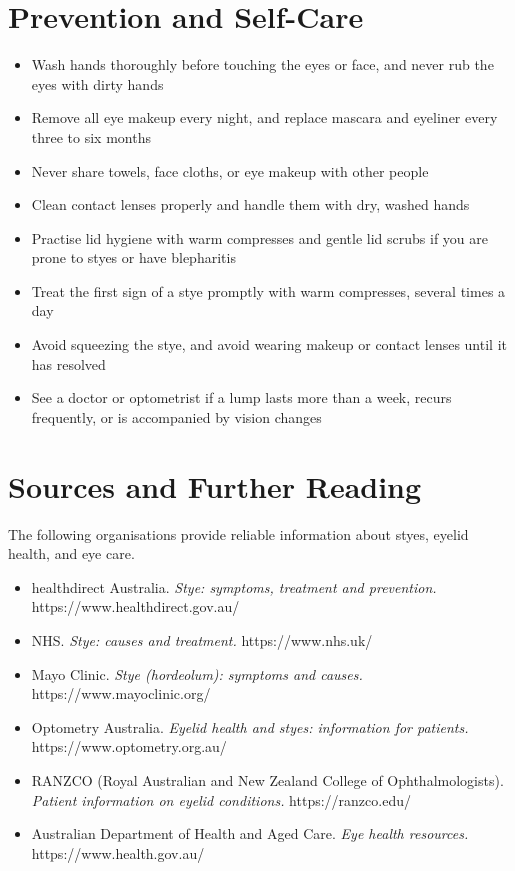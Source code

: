 \section*{Prevention and Self-Care}
\begin{itemize}
    \item Wash hands thoroughly before touching the eyes or face, and never rub the eyes with dirty hands
    \item Remove all eye makeup every night, and replace mascara and eyeliner every three to six months
    \item Never share towels, face cloths, or eye makeup with other people
    \item Clean contact lenses properly and handle them with dry, washed hands
    \item Practise lid hygiene with warm compresses and gentle lid scrubs if you are prone to styes or have blepharitis
    \item Treat the first sign of a stye promptly with warm compresses, several times a day
    \item Avoid squeezing the stye, and avoid wearing makeup or contact lenses until it has resolved
    \item See a doctor or optometrist if a lump lasts more than a week, recurs frequently, or is accompanied by vision changes
\end{itemize}

\section*{Sources and Further Reading}
The following organisations provide reliable information about styes, eyelid health, and eye care.

\begin{itemize}
    \item healthdirect Australia. \textit{Stye: symptoms, treatment and prevention.} https://www.healthdirect.gov.au/
    \item NHS. \textit{Stye: causes and treatment.} https://www.nhs.uk/
    \item Mayo Clinic. \textit{Stye (hordeolum): symptoms and causes.} https://www.mayoclinic.org/
    \item Optometry Australia. \textit{Eyelid health and styes: information for patients.} https://www.optometry.org.au/
    \item RANZCO (Royal Australian and New Zealand College of Ophthalmologists). \textit{Patient information on eyelid conditions.} https://ranzco.edu/
    \item Australian Department of Health and Aged Care. \textit{Eye health resources.} https://www.health.gov.au/
\end{itemize}

\clearpage
